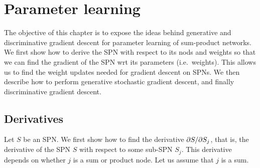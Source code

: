 \chapter{Parameter learning}\label{chp:weights}

The objective of this chapter is to expose the ideas behind generative and discriminative gradient
descent for parameter learning of sum-product networks. We first show how to derive the SPN with
respect to its nods and weights so that we can find the gradient of the SPN wrt its parameters
(i.e.\ weights). This allows us to find the weight updates needed for gradient descent on SPNs. We
then describe how to perform generative stochastic gradient descent, and finally discriminative
gradient descent.

\section{Derivatives}

Let $S$ be an SPN\@. We first show how to find the derivative $\partial S/\partial S_j$, that is, the
derivative of the SPN $S$ with respect to some sub-SPN $S_j$. This derivative depends on whether
$j$ is a sum or product node. Let us assume that $j$ is a sum.
